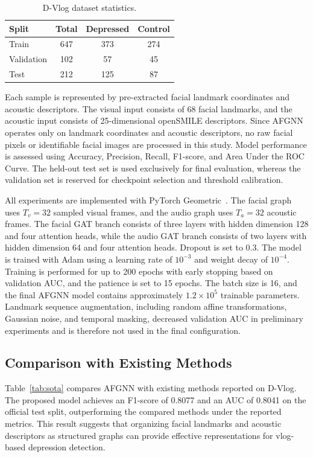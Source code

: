 \documentclass[conference]{IEEEtran}
\begin{document}
\begin{table}[htb]
\centering
\caption{D-Vlog dataset statistics.}
\label{tab:dataset}
\begin{tabular}{lccc}
\toprule[1.2pt]
Split & Total & Depressed & Control \\
\midrule[0.8pt]
Train & 647 & 373 & 274 \\
Validation & 102 & 57 & 45 \\
Test & 212 & 125 & 87 \\
\bottomrule[1.2pt]
\end{tabular}
\end{table}


Each sample is represented by pre-extracted facial landmark coordinates and acoustic descriptors. The visual input consists of 68 facial landmarks, and the acoustic input consists of 25-dimensional openSMILE descriptors. Since AFGNN operates only on landmark coordinates and acoustic descriptors, no raw facial pixels or identifiable facial images are processed in this study. Model performance is assessed using Accuracy, Precision, Recall, F1-score, and Area Under the ROC Curve. The held-out test set is used exclusively for final evaluation, whereas the validation set is reserved for checkpoint selection and threshold calibration.



All experiments are implemented with PyTorch Geometric~\cite{fey2019fast}. The facial graph uses $T_v=32$ sampled visual frames, and the audio graph uses $T_a=32$ acoustic frames. The facial GAT branch consists of three layers with hidden dimension 128 and four attention heads, while the audio GAT branch consists of two layers with hidden dimension 64 and four attention heads. Dropout is set to 0.3. The model is trained with Adam using a learning rate of $10^{-3}$ and weight decay of $10^{-4}$. Training is performed for up to 200 epochs with early stopping based on validation AUC, and the patience is set to 15 epochs. The batch size is 16, and the final AFGNN model contains approximately $1.2\times10^5$ trainable parameters. Landmark sequence augmentation, including random affine transformations, Gaussian noise, and temporal masking, decreased validation AUC in preliminary experiments and is therefore not used in the final configuration.


\subsection{Comparison with Existing Methods}
Table~\ref{tab:sota} compares AFGNN with existing methods reported on D-Vlog. The proposed model achieves an F1-score of 0.8077 and an AUC of 0.8041 on the official test split, outperforming the compared methods under the reported metrics. This result suggests that organizing facial landmarks and acoustic descriptors as structured graphs can provide effective representations for vlog-based depression detection.
\end{document}
